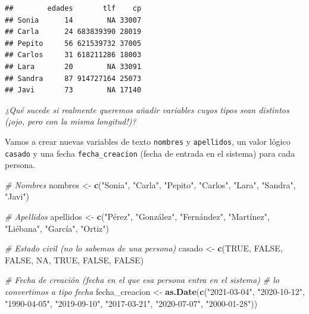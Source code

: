 \documentclass[11pt,]{book}
\newenvironment{Shaded}{\begin{snugshade}}{\end{snugshade}}
\newcommand{\CommentTok}[1]{\textcolor[rgb]{0.37,0.37,0.37}{\textit{#1}}}
\newcommand{\KeywordTok}[1]{\textcolor[rgb]{0.27,0.27,0.27}{\textbf{#1}}}
\newcommand{\NormalTok}[1]{#1}
\newcommand{\OtherTok}[1]{\textcolor[rgb]{0.37,0.37,0.37}{#1}}
\newcommand{\StringTok}[1]{\textcolor[rgb]{0.5,0.5,0.5}{#1}}
\begin{document}
\begin{verbatim}
##        edades       tlf    cp
## Sonia      14        NA 33007
## Carla      24 683839390 28019
## Pepito     56 621539732 37005
## Carlos     31 618211286 18003
## Lara       20        NA 33091
## Sandra     87 914727164 25073
## Javi       73        NA 17140
\end{verbatim}

\emph{¿Qué sucede si realmente queremos añadir variables cuyos tipos sean distintos (¡ojo, pero con la misma longitud!)?}

Vamos a crear nuevas variables de texto \texttt{nombres} y \texttt{apellidos}, un valor lógico \texttt{casado} y una fecha \texttt{fecha\_creacion} (fecha de entrada en el sistema) para cada persona.

\begin{Shaded}
\begin{Highlighting}[]
\CommentTok{# Nombres}
\NormalTok{nombres <-}\StringTok{ }\KeywordTok{c}\NormalTok{(}\StringTok{"Sonia"}\NormalTok{, }\StringTok{"Carla"}\NormalTok{, }\StringTok{"Pepito"}\NormalTok{, }\StringTok{"Carlos"}\NormalTok{, }\StringTok{"Lara"}\NormalTok{, }\StringTok{"Sandra"}\NormalTok{, }\StringTok{"Javi"}\NormalTok{)}

\CommentTok{# Apellidos}
\NormalTok{apellidos <-}\StringTok{ }\KeywordTok{c}\NormalTok{(}\StringTok{"Pérez"}\NormalTok{, }\StringTok{"González"}\NormalTok{, }\StringTok{"Fernández"}\NormalTok{, }\StringTok{"Martínez"}\NormalTok{, }\StringTok{"Liébana"}\NormalTok{, }\StringTok{"García"}\NormalTok{, }\StringTok{"Ortiz"}\NormalTok{)}

\CommentTok{# Estado civil (no lo sabemos de una persona)}
\NormalTok{casado <-}\StringTok{ }\KeywordTok{c}\NormalTok{(}\OtherTok{TRUE}\NormalTok{, }\OtherTok{FALSE}\NormalTok{, }\OtherTok{FALSE}\NormalTok{, }\OtherTok{NA}\NormalTok{, }\OtherTok{TRUE}\NormalTok{, }\OtherTok{FALSE}\NormalTok{, }\OtherTok{FALSE}\NormalTok{)}

\CommentTok{# Fecha de creación (fecha en el que esa persona entra en el sistema)}
\CommentTok{# lo convertimos a tipo fecha}
\NormalTok{fecha_creacion <-}\StringTok{ }\KeywordTok{as.Date}\NormalTok{(}\KeywordTok{c}\NormalTok{(}\StringTok{"2021-03-04"}\NormalTok{, }\StringTok{"2020-10-12"}\NormalTok{, }\StringTok{"1990-04-05"}\NormalTok{,}
                            \StringTok{"2019-09-10"}\NormalTok{, }\StringTok{"2017-03-21"}\NormalTok{, }\StringTok{"2020-07-07"}\NormalTok{,}
                            \StringTok{"2000-01-28"}\NormalTok{))}
\end{Highlighting}
\end{Shaded}
\end{document}
